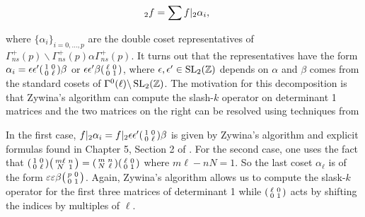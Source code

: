 \begin{align*}
[\Gamma_{ns}^+(p)\alpha\Gamma_{ns}^+(p)]_2 f = \sum f|_2\alpha_i , \hspace{5mm}
\end{align*}

where $\{ \alpha_i \}_{i = 0, \ldots, p}$ are the double coset representatives of $\Gamma_{ns}^+(p)\backslash\Gamma_{ns}^+(p)\alpha\Gamma_{ns}^+(p)$. It turns out that the representatives have the form $\alpha_i = \epsilon\epsilon'\begin{psmallmatrix} 1 & 0 \\ 0 & \ell \end{psmallmatrix}\beta$ or $\epsilon\epsilon' \beta \begin{psmallmatrix} \ell & 0 \\ 0 & 1 \end{psmallmatrix}$, where $\epsilon,\epsilon' \in \operatorname{SL}_2(\mathbb{Z})$ depends on $\alpha$ and $\beta$ comes from the standard cosets of $\Gamma^0(\ell)\backslash \operatorname{SL}_2(\mathbb{Z})$. The motivation for this decomposition is that Zywina's algorithm \cite{Zywina2020ComputingAO} can compute the slash-$k$ operator on determinant 1 matrices and the two matrices on the right can be resolved using techniques from \cite{Shurman}

In the first case, $f|_2 \alpha_i = f|_2 \epsilon\epsilon'\begin{psmallmatrix} 1 & 0 \\ 0 & \ell \end{psmallmatrix}\beta$ is given by Zywina's algorithm and explicit formulas found in Chapter 5, Section 2 of \cite{Shurman}. For the second case, one uses the fact that $\begin{psmallmatrix}
1 & 0\\
0 & \ell
\end{psmallmatrix}\begin{psmallmatrix}
m\ell &  n\\
N & 1
\end{psmallmatrix} = \begin{psmallmatrix}
m &  n\\
N & \ell
\end{psmallmatrix}\begin{psmallmatrix}
\ell & 0\\
0 & 1
\end{psmallmatrix}$ where $m\ell - nN = 1$. So the last coset $\alpha_\ell$ is of the form $\varepsilon\varepsilon\beta \begin{psmallmatrix}
p & 0 \\ 0 & 1
\end{psmallmatrix}$. Again, Zywina's algorithm allows us to compute the slask-$k$ operator for the first three matrices of determinant 1 while $\begin{psmallmatrix} \ell & 0 \\ 0 & 1 \end{psmallmatrix}$ acts by shifting the indices by multiples of $\ell$.


